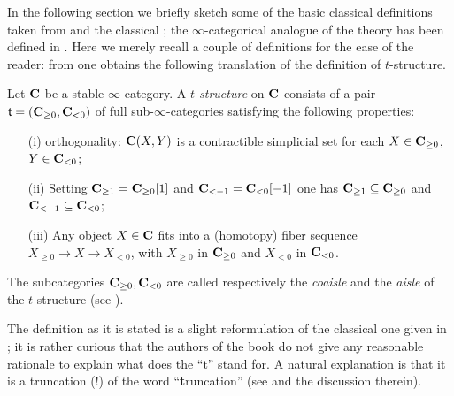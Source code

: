 In the following section we briefly sketch some of the basic classical definitions taken from \cite{Kashiwara} and the classical \cite{BBDPervers}; the $\infty$\hyp{}categorical analogue of the theory has been defined in \cite[\S \textbf{1.2.1}]{LurieHA}. Here we merely recall a couple of definitions for the ease of the reader: from \cite[Def. \textbf{1.2.1.1} and \textbf{1.2.1.4}]{LurieHA} one obtains the following translation of the definition of $t$\hyp{}structure.
\begin{definition}\label{tistru}
Let $\mathbf{C}$ be a stable $\infty$\hyp{}category. A \emph{$t$\hyp{}structure} on $\mathbf{C}$ consists of a pair $\mathfrak{t}=(\mathbf{C}_{\ge 0},\mathbf{C}_{< 0})$ of full sub\hyp{}$\infty$\hyp{}categories satisfying the following properties:
\begin{itemize}
\item[(i)] orthogonality: $\mathbf{C}(X, Y)$ is a contractible simplicial set for each $X\in \mathbf{C}_{\ge 0}$, $Y\in \mathbf{C}_{< 0}$;
\item[(ii)] Setting $\mathbf{C}_{\geq 1}=\mathbf{C}_{\geq 0}[1]$ and $\mathbf{C}_{<-1}= \mathbf{C}_{<0}[-1]$ one has $\mathbf{C}_{\geq 1}\subseteq \mathbf{C}_{\geq 0}$ and $\mathbf{C}_{<-1}\subseteq \mathbf{C}_{<0}$;
\item[(iii)] Any object $X\in\mathbf{C}$ fits into a (homotopy) fiber sequence $X_{\ge 0}\to X\to X_{< 0}$, with $X_{\ge 0}$ in $\mathbf{C}_{\ge 0}$ and $X_{<0}$ in $\mathbf{C}_{< 0}$.
\end{itemize}
The subcategories $\mathbf{C}_{\ge 0},\mathbf{C}_{< 0}$ are called respectively the \emph{coaisle} and the \emph{aisle} of the $t$\hyp{}structure (see \cite{KVaisles}).
\end{definition}
\begin{remark}
The definition as it is stated is a slight reformulation of the classical one given in \cite{BBDPervers}; it is rather curious that the authors of the book do not give any reasonable rationale to explain what does the ``t'' stand for. A natural explanation is that it is a truncation (!) of the word ``\textbf{t}runcation'' (see \cite{why-call-it-t} and the discussion therein).
\end{remark}
